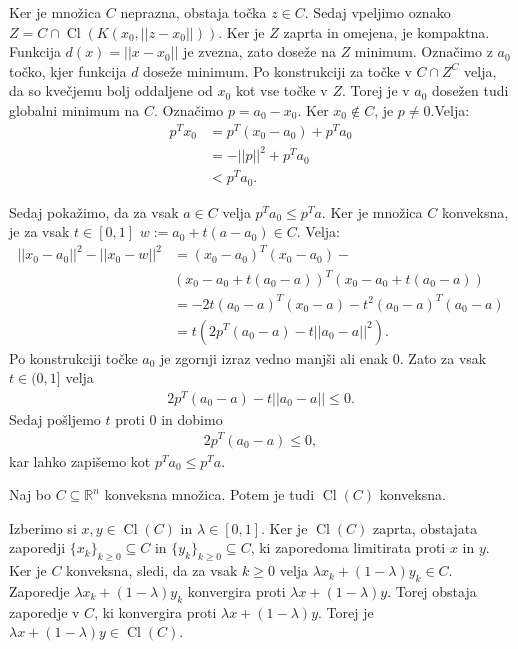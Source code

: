 \documentclass[mat1]{fmfdelo}
\newcommand{\R}{\mathbb R}
\DeclareMathOperator{\Cl}{Cl}
\begin{document}
\begin{dokaz}
	Ker je množica $C$ neprazna, obstaja točka $z\in C$. Sedaj vpeljimo oznako $Z = C \cap \Cl(K(x_0, ||z-x_0||))$. Ker je $Z$ zaprta in omejena,  je kompaktna. Funkcija $d(x) = ||x-x_0||$ je zvezna, zato doseže na $Z$ minimum. Označimo z $a_0$ točko, kjer funkcija $d$ doseže minimum. Po konstrukciji za točke v $C \cap Z^C$ velja, da so kvečjemu bolj oddaljene od $x_0$ kot vse točke v $Z$. Torej je v $a_0$ dosežen tudi globalni minimum na $C$. Označimo $p = a_0 - x_0.$ Ker $x_0 \notin C$, je $p \ne 0.$Velja: 
	\begin{align*}
	p^Tx_0 &= p^T(x_0 - a_0) + p^Ta_0\\
	&= -||p||^2 + p^Ta_0 \\
	&< p^Ta_0.
	\end{align*}
	
	
	Sedaj pokažimo, da za vsak $a\in C$ velja $p^Ta_0 \le p^Ta$. Ker je množica $C$ konveksna, je za vsak  $t \in [0,1]$ $w := a_0 + t(a-a_0)  \in C$. Velja:
	\begin{align*}
	||x_0 - a_0||^2  - ||x_0 - w||^2  &= (x_0 - a_0)^T(x_0 - a_0) -\\
	& (x_0 - a_0 + t(a_0-a))^T(x_0 - a_0 + t(a_0-a))\\
	&= -2t(a_0 - a)^T(x_0 - a) - t^2(a_0 - a)^T(a_0 - a) \\
	&= t (2p^T(a_0-a) - t||a_0-a||^2).
	\end{align*}
	Po konstrukciji točke $a_0$ je zgornji izraz vedno manjši ali enak $0$. Zato za vsak $t \in (0,1]$ velja
	\begin{align*}
	2p^T (a_0 - a )- t ||a_0-a|| \le 0.
	\end{align*}
	Sedaj pošljemo $t$ proti 0 in dobimo 
	\begin{align*}
	2p^T(a_0-a) \le  0,
	\end{align*}
	kar lahko zapišemo kot $p^Ta_0 \le p^Ta$.
\end{dokaz}

\begin{lema}\label{konveksnozaprtje}
	Naj bo $C \subseteq \R^n$ konveksna množica. Potem je tudi $\Cl(C)$ konveksna.
\end{lema}

\begin{dokaz}
	Izberimo si $x, y \in \Cl(C)$ in $\lambda \in [0,1]$. Ker je $\Cl(C)$ zaprta, obstajata zaporedji $\{x_k\}_{k\ge0} \subseteq C$ in $\{y_k\}_{k\ge0} \subseteq C$, ki zaporedoma limitirata proti $x$ in $y$. Ker je $C$ konveksna, sledi, da za vsak $k \ge 0$ velja $\lambda x_k + (1 - \lambda )y_k \in C$. Zaporedje $\lambda x_k + (1 - \lambda )y_k$ konvergira proti   $\lambda x + (1 - \lambda )y$. Torej obstaja zaporedje v $C$, ki konvergira proti $\lambda x + (1 - \lambda )y$. Torej je  $\lambda x + (1 - \lambda )y \in \Cl(C)$.
\end{dokaz}
\end{document}
